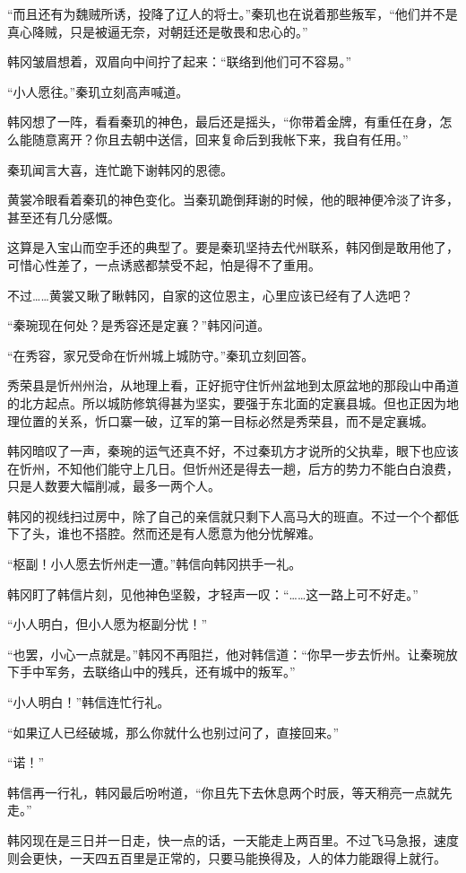 “而且还有为魏贼所诱，投降了辽人的将士。”秦玑也在说着那些叛军，“他们并不是真心降贼，只是被逼无奈，对朝廷还是敬畏和忠心的。”

韩冈皱眉想着，双眉向中间拧了起来：“联络到他们可不容易。”

“小人愿往。”秦玑立刻高声喊道。

韩冈想了一阵，看看秦玑的神色，最后还是摇头，“你带着金牌，有重任在身，怎么能随意离开？你且去朝中送信，回来复命后到我帐下来，我自有任用。”

秦玑闻言大喜，连忙跪下谢韩冈的恩德。

黄裳冷眼看着秦玑的神色变化。当秦玑跪倒拜谢的时候，他的眼神便冷淡了许多，甚至还有几分感慨。

这算是入宝山而空手还的典型了。要是秦玑坚持去代州联系，韩冈倒是敢用他了，可惜心性差了，一点诱惑都禁受不起，怕是得不了重用。

不过……黄裳又瞅了瞅韩冈，自家的这位恩主，心里应该已经有了人选吧？

“秦琬现在何处？是秀容还是定襄？”韩冈问道。

“在秀容，家兄受命在忻州城上城防守。”秦玑立刻回答。

秀荣县是忻州州治，从地理上看，正好扼守住忻州盆地到太原盆地的那段山中甬道的北方起点。所以城防修筑得甚为坚实，要强于东北面的定襄县城。但也正因为地理位置的关系，忻口寨一破，辽军的第一目标必然是秀荣县，而不是定襄城。

韩冈暗叹了一声，秦琬的运气还真不好，不过秦玑方才说所的父执辈，眼下也应该在忻州，不知他们能守上几日。但忻州还是得去一趟，后方的势力不能白白浪费，只是人数要大幅削减，最多一两个人。

韩冈的视线扫过房中，除了自己的亲信就只剩下人高马大的班直。不过一个个都低下了头，谁也不搭腔。然而还是有人愿意为他分忧解难。

“枢副！小人愿去忻州走一遭。”韩信向韩冈拱手一礼。

韩冈盯了韩信片刻，见他神色坚毅，才轻声一叹：“……这一路上可不好走。”

“小人明白，但小人愿为枢副分忧！”

“也罢，小心一点就是。”韩冈不再阻拦，他对韩信道：“你早一步去忻州。让秦琬放下手中军务，去联络山中的残兵，还有城中的叛军。”

“小人明白！”韩信连忙行礼。

“如果辽人已经破城，那么你就什么也别过问了，直接回来。”

“诺！”

韩信再一行礼，韩冈最后吩咐道，“你且先下去休息两个时辰，等天稍亮一点就先走。”

韩冈现在是三日并一日走，快一点的话，一天能走上两百里。不过飞马急报，速度则会更快，一天四五百里是正常的，只要马能换得及，人的体力能跟得上就行。

